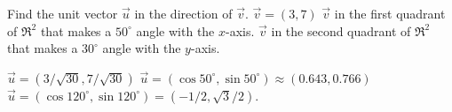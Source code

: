 
\begin{Exercise}[
name={},
title={}, 
difficulty=0,
origin={\cite{GHC}}]
Find the unit vector $\vec u$ in the direction of $\vec v$.
\Question $\vec v = (3,7)$
\Question $\vec v$ in the first quadrant of $\Re^2$ that makes a $50^\circ$ angle with the $x$-axis.
\Question $\vec v$ in the second quadrant of $\Re^2$ that makes a $30^\circ$ angle with the $y$-axis.
\end{Exercise}

\begin{Answer}
\Question $\vec u = (3/\sqrt{30},7/\sqrt{30})$
\Question $\vec u = (\cos 50^\circ,\sin 50^\circ) \approx (0.643,0.766)$
\Question $\vec u = (\cos 120^\circ,\sin 120^\circ) = (-1/2,\sqrt{3}/2)$.
\end{Answer}
